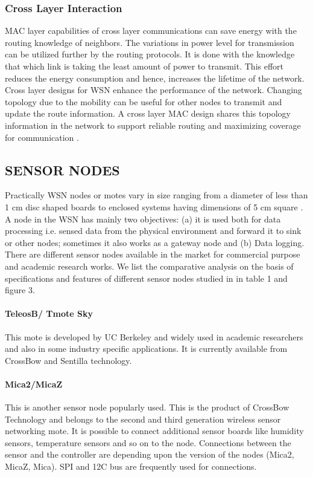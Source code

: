 \documentclass[12pt,journal,communications surveys and tutorials]{IEEEtran}
\begin{document}
\subsubsection{Cross Layer Interaction}
 MAC layer capabilities of cross layer communications can save energy with the routing knowledge of neighbors. The variations in power level for transmission can be utilized further by the routing protocols. It is done with the knowledge that which link is taking the least amount of power to transmit. This effort reduces the energy consumption and hence, increases the lifetime of the network. Cross layer designs for WSN enhance the performance of the network. Changing topology due to the mobility can be useful for other nodes to transmit and update the route information. A cross layer MAC design shares this topology information in the network to support reliable routing and maximizing coverage for communication \cite{akyildiz2006wireless,chehri2012empirical}.
\subsection{SENSOR NODES}
Practically WSN nodes or motes vary in size ranging from a diameter of less than 1 cm disc shaped boards to enclosed systems having dimensions of 5 cm square \cite{johnson2009comparative}. A node in the WSN has mainly two objectives: (a) it is used both for data processing i.e. sensed data from the physical environment and forward it to sink or other nodes; sometimes it also works as a gateway node  and (b) Data logging. There are different sensor nodes available in the market for commercial purpose and academic research works. We list the comparative analysis on the basis of specifications and features of different sensor nodes studied in \cite{johnson2009comparative} in table 1 and figure 3.
\paragraph{TeleosB/ Tmote Sky}
This mote is developed by UC Berkeley and widely used in academic researchers and also in some industry specific applications. It is currently available from CrossBow and Sentilla technology.
\paragraph{Mica2/MicaZ}
This is another sensor node popularly used. This is the product of CrossBow Technology and belongs to the second and third generation wireless sensor networking mote. It is possible to connect additional sensor boards like humidity sensors, temperature sensors and so on to the node. Connections between the sensor and the controller are depending upon the version of the nodes (Mica2, MicaZ, Mica). SPI and 12C bus are frequently used for connections.
\end{document}
